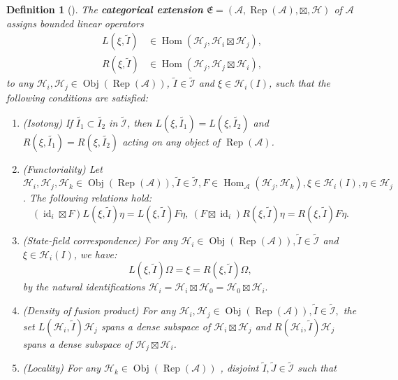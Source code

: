 \documentclass{article}
\newtheorem{definition}{Definition}
\newcommand{\hilb}{\mathcal{H}}
\newcommand{\A}{\mathcal{A}}
\begin{document}
\begin{definition}[\cite{gui2021categorical}]
    The \textbf{categorical extension} $\mathfrak{E}=(\A, \operatorname{Rep}(\A), \boxtimes , \hilb)$ of $\A$ assigns bounded linear operators 
    \begin{align*}
        L(\xi, \widetilde{I}) &\in \operatorname{Hom}(\hilb_j, \hilb_i \boxtimes \hilb_j), \\
        R(\xi, \widetilde{I}) &\in \operatorname{Hom}(\hilb_j, \hilb_j\boxtimes  \hilb_i),
    \end{align*}
    to any $\hilb_i, \hilb_j \in \operatorname{Obj}(\operatorname{Rep}(\A))$, $\widetilde{I}\in \widetilde{\mathcal{I}}$ and $\xi \in \hilb_i(I)$, such that the following conditions are satisfied:
    \begin{enumerate}[A]
        \item (Isotony) If $\widetilde{I_1} \subset \widetilde{I_2}$ in $\widetilde{\mathcal{I}}$, then $L(\xi,\widetilde{I_1}) = L(\xi, \widetilde{I_2})$ and $R(\xi,\widetilde{I_1}) = R(\xi, \widetilde{I_2})$ acting on any object of $\operatorname{Rep}(\A)$. 
        \item (Functoriality) Let $\hilb_i, \hilb_j, \hilb_k \in \operatorname{Obj}(\operatorname{Rep}(\A)), \widetilde{I}\in \widetilde{\mathcal{I}}, F \in \operatorname{Hom}_{\A}(\hilb_j,\hilb_k), \xi\in\hilb_i(I), \eta\in\hilb_j$. The following relations hold:
        \[
        (\operatorname{id}_i\boxtimes F)L(\xi,\widetilde{I})\eta = L(\xi,\widetilde{I})F\eta, \ (F\boxtimes \operatorname{id}_i)R(\xi,\widetilde{I})\eta = R(\xi,\widetilde{I})F\eta.
        \]
        \item (State-field correspondence) For any $\hilb_i\in \operatorname{Obj}(\operatorname{Rep}(\A)), \widetilde{I}\in \widetilde{\mathcal{I}} $ and $\xi\in\hilb_i(I)$,
        we have:
        \[
        L(\xi,\widetilde{I})\Omega = \xi = R(\xi,\widetilde{I})\Omega,
        \]
        by the natural identifications $\hilb_i = \hilb_i\boxtimes\hilb_0 = \hilb_0\boxtimes \hilb_i.$
        \item (Density of fusion product) For any $\hilb_i, \hilb_j \in  \operatorname{Obj}(\operatorname{Rep}(\A)), \widetilde{I}\in \widetilde{\mathcal{I}} ,$
        the set $L(\hilb_i,\widetilde{I})\hilb_j$ spans a dense subspace of $\hilb_i\boxtimes\hilb_j$ and 
        $R(\hilb_i,\widetilde{I})\hilb_j$ spans a dense subspace of  $\hilb_j\boxtimes \hilb_i$.
        \item (Locality) For any $\hilb_k \in  \operatorname{Obj}(\operatorname{Rep}(\A)) $ , disjoint  $\widetilde{I},\widetilde{J}\in \widetilde{\mathcal{I}}$ such that 

\end{enumerate}
\end{definition}
\end{document}
